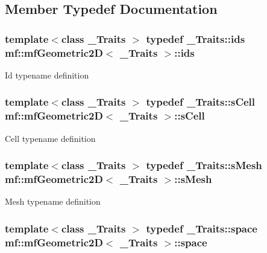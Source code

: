 \subsection{Member Typedef Documentation}
\hypertarget{classmf_1_1mfGeometric2D_a1a86a0d9076b7362d928c25126d18b7b}{
\subsubsection[{ids}]{\setlength{\rightskip}{0pt plus 5cm}template$<$class \_\-Traits $>$ typedef \_\-Traits::ids {\bf mf::mfGeometric2D}$<$ \_\-Traits $>$::{\bf ids}}}
\label{classmf_1_1mfGeometric2D_a1a86a0d9076b7362d928c25126d18b7b}
Id typename definition \hypertarget{classmf_1_1mfGeometric2D_a545916ef70ee88b8be647a8950e2bc4f}{
\subsubsection[{sCell}]{\setlength{\rightskip}{0pt plus 5cm}template$<$class \_\-Traits $>$ typedef \_\-Traits::sCell {\bf mf::mfGeometric2D}$<$ \_\-Traits $>$::{\bf sCell}}}
\label{classmf_1_1mfGeometric2D_a545916ef70ee88b8be647a8950e2bc4f}
Cell typename definition \hypertarget{classmf_1_1mfGeometric2D_a5d9ae6b14eb6f0bad24d9a38567a9466}{
\subsubsection[{sMesh}]{\setlength{\rightskip}{0pt plus 5cm}template$<$class \_\-Traits $>$ typedef \_\-Traits::sMesh {\bf mf::mfGeometric2D}$<$ \_\-Traits $>$::{\bf sMesh}}}
\label{classmf_1_1mfGeometric2D_a5d9ae6b14eb6f0bad24d9a38567a9466}
Mesh typename definition \hypertarget{classmf_1_1mfGeometric2D_a6e4fccf14c9c28a5be638f0254b5af07}{
\subsubsection[{space}]{\setlength{\rightskip}{0pt plus 5cm}template$<$class \_\-Traits $>$ typedef \_\-Traits::space {\bf mf::mfGeometric2D}$<$ \_\-Traits $>$::{\bf space}}}
\label{classmf_1_1mfGeometric2D_a6e4fccf14c9c28a5be638f0254b5af07}
